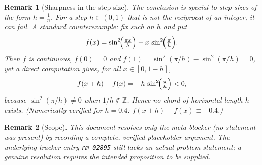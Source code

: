\documentclass{article}
\newtheorem{remark}{Remark}
\begin{document}
\begin{remark}[Sharpness in the step size]
The conclusion is special to step sizes of the form $h=\tfrac1n$. For a step
$h\in(0,1)$ that is \emph{not} the reciprocal of an integer, it can fail. A
standard counterexample: fix such an $h$ and put
\[
  f(x)=\sin^2\!\Bigl(\tfrac{\pi x}{h}\Bigr)-x\,\sin^2\!\Bigl(\tfrac{\pi}{h}\Bigr).
\]
Then $f$ is continuous, $f(0)=0$ and $f(1)=\sin^2(\pi/h)-\sin^2(\pi/h)=0$, yet a
direct computation gives, for all $x\in[0,1-h]$,
\[
  f(x+h)-f(x)=-h\,\sin^2\!\Bigl(\tfrac{\pi}{h}\Bigr)<0,
\]
because $\sin^2(\pi/h)\neq0$ when $1/h\notin\mathbb{Z}$. Hence no chord of
horizontal length $h$ exists. (Numerically verified for $h=0.4$:
$f(x+h)-f(x)\equiv-0.4$.)
\end{remark}

\begin{remark}[Scope]
This document resolves only the meta-blocker (no statement was present) by
recording a complete, verified placeholder argument. The underlying tracker
entry \texttt{rm-02895} still lacks an actual problem statement; a genuine
resolution requires the intended proposition to be supplied.
\end{remark}
\end{document}
